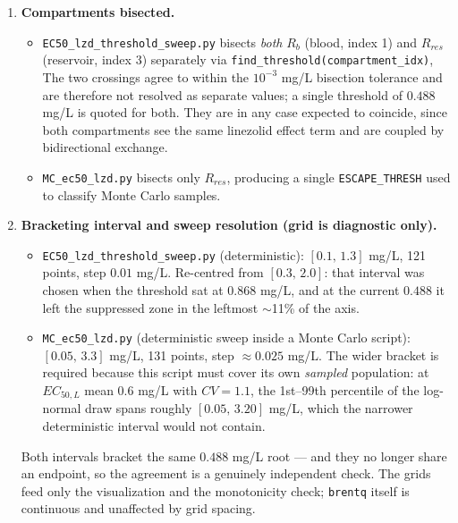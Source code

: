 \documentclass{article}
\begin{document}
\begin{enumerate}
  \item \textbf{Compartments bisected.}
  \begin{itemize}
    \item \texttt{EC50\_lzd\_threshold\_sweep.py} bisects \emph{both}
          $R_b$ (blood, index 1) and $R_{res}$ (reservoir, index 3)
          separately via \texttt{find\_threshold(compartment\_idx)},
          The two crossings agree to within the $10^{-3}$ mg/L bisection
          tolerance and are therefore not resolved as separate values; a
          single threshold of $0.488$ mg/L is quoted for both. They are in
          any case expected to coincide, since both compartments see the
          same linezolid effect term and are coupled by bidirectional
          exchange.
    \item \texttt{MC\_ec50\_lzd.py} bisects only $R_{res}$, producing a
          single \texttt{ESCAPE\_THRESH} used to classify Monte Carlo
          samples.
  \end{itemize}

  \item \textbf{Bracketing interval and sweep resolution (grid is
        diagnostic only).}
  \begin{itemize}
    \item \texttt{EC50\_lzd\_threshold\_sweep.py} (deterministic):
          $[0.1,\,1.3]$ mg/L, 121 points, step $0.01$ mg/L. Re-centred
          from $[0.3,\,2.0]$: that interval was chosen when the threshold
          sat at $0.868$ mg/L, and at the current $0.488$ it left the
          suppressed zone in the leftmost $\sim$11\% of the axis.
    \item \texttt{MC\_ec50\_lzd.py} (deterministic sweep inside a Monte
          Carlo script): $[0.05,\,3.3]$ mg/L, 131 points,
          step $\approx 0.025$ mg/L. The wider bracket is required because
          this script must cover its own \emph{sampled} population: at
          $EC_{50,L}$ mean $0.6$ mg/L with $CV = 1.1$, the 1st--99th
          percentile of the log-normal draw spans roughly $[0.05,\,3.20]$
          mg/L, which the narrower deterministic interval would not contain.
  \end{itemize}
  Both intervals bracket the same $0.488$ mg/L root --- and they no longer
  share an endpoint, so the agreement is a genuinely independent check. The grids feed only
  the visualization and the monotonicity check; \texttt{brentq} itself is
  continuous and unaffected by grid spacing.


\end{enumerate}
\end{document}
